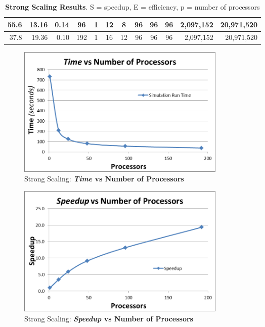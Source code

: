 \documentclass[]{article}
\begin{document}
\begin{table}[h!]
\begin{tabular}{|r|r|r|c|c|c|c|c|c|c|r|r|}
55.6                                                  & 13.16                                              & 0.14                                              & 96                          & 1           & 12          & 8           & 96           & 96           & 96          & 2,097,152                                                & 20,971,520                                                   \\ \hline
37.8                                                  & 19.36                                              & 0.10                                              & 192                         & 1           & 16          & 12          & 96           & 96           & 96          & 2,097,152                                                & 20,971,520                                                   \\ \hline
\end{tabular}
\caption{\textbf{Strong Scaling Results}. S = speedup, E = efficiency, p = number of processors}
\end{table}


\begin{figure}[h!]
    \centering
    \includegraphics[width=10cm]{strong_times.png}
    \caption{Strong Scaling: \textbf{\textit{Time} vs Number of Processors}}
\end{figure}

\newpage

\begin{figure}[h!]
    \centering
    \includegraphics[width=10cm]{strong_speedup.png}
    \caption{Strong Scaling: \textbf{\textit{Speedup} vs Number of Processors}}
\end{figure}
\end{document}
